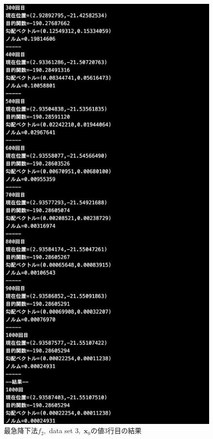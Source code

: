 \documentclass[12pt]{jarticle}
\begin{document}
\begin{figure}[h]
\begin{minipage}{0.5\hsize}
    \end{minipage}
    \begin{minipage}{0.5\hsize}
        \begin{center}
            \includegraphics[scale=0.2]{kadai1_2s_out3_3_3.png}
        \end{center}
    \end{minipage}
    \caption{最急降下法$f_2$,\ data set 3,\ $\boldsymbol{x}_0$の値3行目の結果}
\end{figure}
\end{document}

